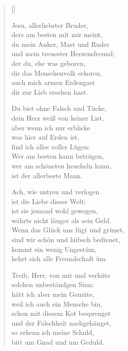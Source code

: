 \begin{multicols}{2}
\settowidth{\versewidth}{Wenn die Zung und Mund nur liebet,}
\begin{verse}[\versewidth]

 Jesu, allerliebster Bruder,\\
ders am besten mit mir meint,\\
du mein Anker, Mast und Ruder\\
und mein treuester Herzensfreund;\\
der du, ehe was geboren,\\
dir das Menschenvolk erkoren,\\
auch mich armen Erdengast\\
dir zur Lieb ersehen hast.

 Du bist ohne Falsch und Tücke,\\
dein Herz weiß von keiner List,\\
aber wenn ich nur erblicke\\
was hier auf Erden ist,\\
find ich alles voller Lügen:\\
Wer am besten kann betrügen,\\
wer am schönsten heucheln kann,\\
ist der allerbeste Mann.

 Ach, wie untreu und verlogen\\
ist die Liebe dieser Welt;\\
ist sie jemand wohl gewogen,\\
währts nicht länger als sein Geld.\\
Wenn das Glück uns fügt und grünet,\\
sind wir schön und hübsch bedienet,\\
kommt ein wenig Ungestüm,\\
kehrt sich alle Freundschaft üm.

 Treib, Herr, von mir und verhüte\\
solchen unbeständgen Sinn;\\
hätt ich aber mein Gemüte,\\
weil ich auch ein Mensche bin,\\
schon mit diesem Kot besprenget\\
und der Falschheit nachgehänget,\\
so erkenn ich meine Schuld,\\
bitt um Gnad und um Geduld.


\end{verse}
\end{multicols}
